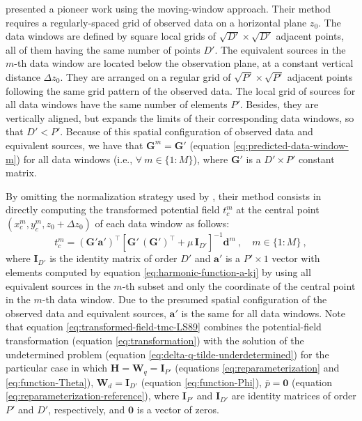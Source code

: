 \cite{leao-silva1989} presented a pioneer work using the moving-window approach.
Their method requires a regularly-spaced grid of observed data on a horizontal plane $z_{0}$. 
The data windows are defined by square local grids of $\sqrt{D'} \times \sqrt{D'}$ adjacent points, all of them having the
same number of points $D'$.
The equivalent sources in the $m$-th data window are located below the observation plane, at a constant vertical distance
$\Delta z_{0}$. They are arranged on a regular grid of $\sqrt{P'} \times \sqrt{P'}$ adjacent points 
following the same grid pattern of the observed data. 
The local grid of sources for all data windows have the same number of elements $P'$.
Besides, they are vertically aligned, but expands the limits of their corresponding data windows,
so that $D' < P'$.
Because of this spatial configuration of observed data and equivalent sources, we have that
$\mathbf{G}^{m} = \mathbf{G}'$ (equation \ref{eq:predicted-data-window-m}) for all data windows 
(i.e., $\forall \: m \in \{1 : M\}$), where $\mathbf{G}'$ is a $D' \times P'$ constant matrix.

By omitting the normalization strategy used by \cite{leao-silva1989}, their method consists in 
directly computing the transformed potential field $t^{m}_{c}$ at the central point $(x^{m}_{c}, y^{m}_{c}, z_{0} + \Delta z_{0})$ 
of each data window as follows:
\begin{equation}
	t^{m}_{c} = \left( \mathbf{G}' \mathbf{a}' \right)^{\top} 
	\left[ \mathbf{G}' \, \left( \mathbf{G}' \right)^{\top} + \mu \, \mathbf{I}_{D'} \right]^{-1} 
	\mathbf{d}^{m} \: , \quad m \in \{ 1 : M \} \: ,
	\label{eq:transformed-field-tmc-LS89}
\end{equation}
where $\mathbf{I}_{D'}$ is the identity matrix of order $D'$ and
$\mathbf{a}'$ is a $P' \times 1$ vector with elements computed by equation 
\ref{eq:harmonic-function-a-kj} by using all equivalent sources in the $m$-th subset and
only the coordinate of the central point in the $m$-th data window.
Due to the presumed spatial configuration of the observed 
data and equivalent sources, $\mathbf{a}'$ is the same for all data windows.
Note that equation \ref{eq:transformed-field-tmc-LS89} combines the potential-field transformation
(equation \ref{eq:transformation}) with the solution of the undetermined problem
(equation \ref{eq:delta-q-tilde-underdetermined}) for the particular case in which 
$\mathbf{H} = \mathbf{W}_{q} = \mathbf{I}_{P'}$ (equations \ref{eq:reparameterization} and \ref{eq:function-Theta}),
$\mathbf{W}_{d} = \mathbf{I}_{D'}$ (equation \ref{eq:function-Phi}), $\bar{p} = \mathbf{0}$ 
(equation \ref{eq:reparameterization-reference}), 
where $\mathbf{I}_{P'}$ and $\mathbf{I}_{D'}$ are identity matrices 
of order $P'$ and $D'$, respectively, and $\mathbf{0}$ is a vector of zeros. 

